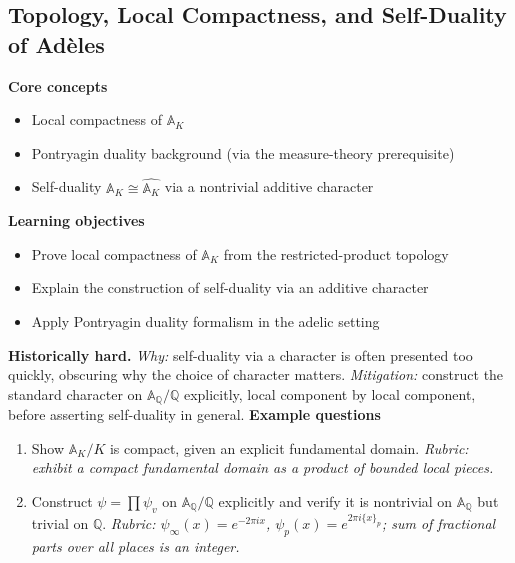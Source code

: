 \documentclass[11pt]{article}
\newcommand{\Q}{\mathbb{Q}}
\newcommand{\A}{\mathbb{A}}
\begin{document}
\subsection{Topology, Local Compactness, and Self-Duality of Adèles}
\textbf{Core concepts}
\begin{itemize}[noitemsep]
  \item Local compactness of $\A_K$
  \item Pontryagin duality background (via the measure-theory prerequisite)
  \item Self-duality $\A_K \cong \widehat{\A_K}$ via a nontrivial additive character
\end{itemize}
\textbf{Learning objectives}
\begin{itemize}[noitemsep]
  \item Prove local compactness of $\A_K$ from the restricted-product topology
  \item Explain the construction of self-duality via an additive character
  \item Apply Pontryagin duality formalism in the adelic setting
\end{itemize}
\textbf{Historically hard.} \emph{Why:} self-duality via a character is often presented too quickly, obscuring why the choice of character matters. \emph{Mitigation:} construct the standard character on $\A_\Q/\Q$ explicitly, local component by local component, before asserting self-duality in general.
\textbf{Example questions}
\begin{enumerate}[noitemsep]
  \item[Q1 (foundational).] Show $\A_K/K$ is compact, given an explicit fundamental domain. \emph{Rubric: exhibit a compact fundamental domain as a product of bounded local pieces.}
  \item[Q2 (advanced).] Construct $\psi = \prod \psi_v$ on $\A_\Q/\Q$ explicitly and verify it is nontrivial on $\A_\Q$ but trivial on $\Q$. \emph{Rubric: $\psi_\infty(x)=e^{-2\pi i x}$, $\psi_p(x)=e^{2\pi i \{x\}_p}$; sum of fractional parts over all places is an integer.}
\end{enumerate}

\end{document}
